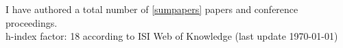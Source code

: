 \begin{publications}
I have authored a total number of \ref{sumpapers} papers and
conference proceedings. \\
h-index factor: 18 according to ISI Web of Knowledge (last update \today)

\end{publications}

